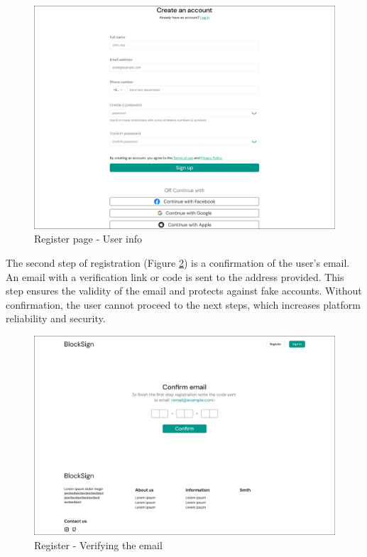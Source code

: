 \begin{figure}[H]
    \centering
    \includegraphics[width=18cm]{"images/figmaUI/register1-crop.png"}
    \caption{Register page - User info}
    \label{register}
\end{figure}

The second step of registration (Figure \ref{registerstep2}) is a confirmation of the user's email. 
An email with a verification link or code is sent to the address provided. 
This step ensures the validity of the email and protects against fake accounts. 
Without confirmation, the user cannot proceed to the next steps, which increases platform reliability and security. 

\begin{figure}[H]
    \centering
    \includegraphics[width=18cm]{"images/figmaUI/registerstep2.png"}
    \caption{Register - Verifying the email}
    \label{registerstep2}
\end{figure}

